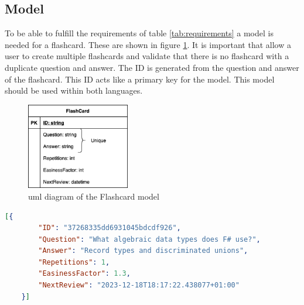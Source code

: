     \subsection{Model}
    To be able to fulfill the requirements of table \ref{tab:requirements} a model is needed for a flashcard. These are shown in figure \ref{fig:model}. It is important that allow a user to create multiple flashcards and validate that there is no flashcard with a duplicate question and answer. The ID is generated from the question and answer of the flashcard. This ID acts like a primary key for the model. This model should be used within both languages.

    \begin{figure}
        \centering
        \includegraphics[width=0.4\textwidth]{NerddeckModel.png}
        \caption{\ac{uml} diagram of the Flashcard model}\label{fig:model}
    \end{figure}

    \begin{lstlisting}[language=json,firstnumber=1,float=tp, caption={Example of how a flashcard is saved inside a \ac{json} file}, label=l:flashcardjson]
    [{
        "ID": "37268335dd6931045bdcdf926",
        "Question": "What algebraic data types does F# use?",
        "Answer": "Record types and discriminated unions",
        "Repetitions": 1,
        "EasinessFactor": 1.3,
        "NextReview": "2023-12-18T18:17:22.438077+01:00"
    }]   
    \end{lstlisting}

